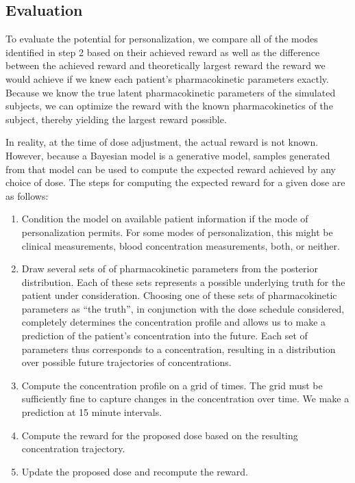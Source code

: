 \subsection{Evaluation}

To evaluate the potential for personalization, we compare all of the modes identified in step 2 based on their achieved reward as well as the difference between the achieved reward and theoretically largest reward the reward we would achieve if we knew each patient's pharmacokinetic parameters exactly. Because we know the true latent pharmacokinetic parameters of the simulated subjects, we can optimize the reward with the known pharmacokinetics of the subject, thereby yielding the largest reward possible.

In reality, at the time of dose adjustment, the actual reward is not known.  However, because a Bayesian model is a generative model, samples generated from that model can be used to compute the expected reward achieved by any choice of dose.  The steps for computing the expected reward for a given dose are as follows:

\begin{enumerate}
	\item Condition the model on available patient information if the mode of personalization permits. For some modes of personalization, this might be clinical measurements, blood concentration measurements, both, or neither.
	
	\item Draw several sets of of pharmacokinetic parameters from the posterior distribution. Each of these sets represents a possible underlying truth for the patient  under consideration. Choosing one of these sets of pharmacokinetic parameters as ``the truth'', in conjunction with the dose schedule considered, completely determines the concentration profile and allows us to make a prediction of the patient's concentration into the future. Each set of parameters thus corresponds to a concentration, resulting in a distribution over possible future trajectories of concentrations.
	
	\item Compute the concentration profile on a grid of times.  The grid must be sufficiently fine to capture changes in the concentration over time.  We make a prediction at 15 minute intervals.
	
	\item Compute the reward for the proposed dose based on the resulting concentration trajectory.
	
	\item Update the proposed dose and recompute the reward.
\end{enumerate}

